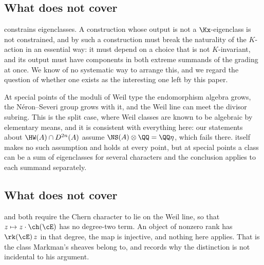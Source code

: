 \subsection{What \texorpdfstring{}{the character obstruction} does not cover}

\begin{remark}\label{rem:nonequivariant}
 constrains eigenclasses. A construction whose output is
not a $\Kx$-eigenclass is not constrained, and by 
such a construction must break the naturality of the $K$-action in an
essential way: it must depend on a choice that is not $K$-invariant, and its
output must have components in both extreme summands of the grading at once.
We know of no systematic way to arrange this, and we regard the question of
whether one exists as the interesting one left by this paper.
\end{remark}

\begin{remark}\label{rem:special}
At special points of the moduli of Weil type the endomorphism algebra grows,
the N\'eron--Severi group grows with it, and the Weil line can meet the divisor
subring. This is the split case, where Weil classes are known to be algebraic
by elementary means, and it is consistent with everything here: our statements
about $\HW(A)\cap D^{2n}(A)$ assume $\NS(A)\otimes\QQ=\QQ\eta$, which fails
there.  itself makes no such assumption and holds at every
point, but at special points a class can be a sum of eigenclasses for several
characters and the conclusion applies to each summand separately.
\end{remark}

\subsection{What \texorpdfstring{}{the semiregularity statement} does not cover}

\begin{remark}\label{rem:positiverankscope}
 and  both require the Chern character to
lie on the Weil line, so that $z\mapsto z\cdot\ch(\cE)$ has no degree-two
term. An object of nonzero rank has $\rk(\cE)\,z$ in that degree, the map is
injective, and nothing here applies. That is the class Markman's sheaves
belong to, and  records why the distinction is not
incidental to his argument.
\end{remark}

